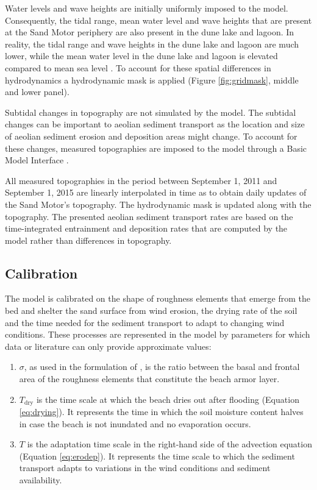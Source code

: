 Water levels and wave heights are initially uniformly imposed to the
model. Consequently, the tidal range, mean water level and wave
heights that are present at the Sand Motor periphery are also present
in the dune lake and lagoon. In reality, the tidal range and wave
heights in the dune lake and lagoon are much lower, while the mean
water level in the dune lake and lagoon is elevated compared to mean
sea level \citep{deVries2015}. To account for these spatial
differences in hydrodynamics a hydrodynamic mask is applied (Figure
\ref{fig:gridmask}, middle and lower panel).

Subtidal changes in topography are not simulated by the model. The
subtidal changes can be important to aeolian sediment transport as the
location and size of aeolian sediment erosion and deposition areas
might change. To account for these changes, measured topographies are
imposed to the model through a Basic Model Interface
\citep[BMI,][]{Peckham2013}.

All measured topographies in the period between September 1, 2011 and
September 1, 2015 are linearly interpolated in time as to obtain daily
updates of the Sand Motor's topography. The hydrodynamic mask is
updated along with the topography. The presented aeolian sediment
transport rates are based on the time-integrated entrainment and
deposition rates that are computed by the model rather than
differences in topography.

\subsection{Calibration}

The model is calibrated on the shape of roughness elements that emerge
from the bed and shelter the sand surface from wind erosion, the
drying rate of the soil and the time needed for the sediment transport
to adapt to changing wind conditions. These processes are represented
in the model by parameters for which data or literature can only
provide approximate values:

\begin{enumerate}
\item $\sigma$, as used in the formulation of \citet[][Equation
  \ref{eq:raupach}]{Raupach1993}, is the ratio between the basal and
  frontal area of the roughness elements that constitute the beach
  armor layer.
\item $T_{\mathrm{dry}}$ is the time scale at which the beach dries
  out after flooding (Equation \ref{eq:drying}). It represents the
  time in which the soil moisture content halves in case the beach is
  not inundated and no evaporation occurs.
\item $T$ is the adaptation time scale in the right-hand side of the
  advection equation (Equation \ref{eq:erodep}). It represents the
  time scale to which the sediment transport adapts to variations in
  the wind conditions and sediment availability.
\end{enumerate}

